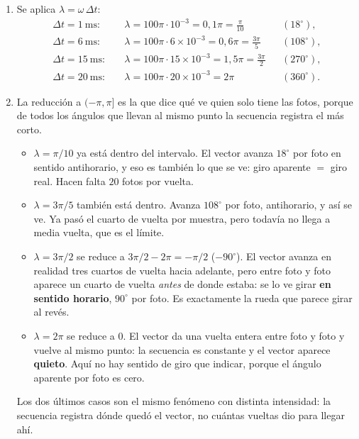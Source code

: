 \documentclass[10pt,a4paper]{article}
\begin{document}
	\begin{enumerate}
		\item Se aplica $\lambda = \omega\,\Delta t$:
		\[
			\begin{aligned}
				\Delta t = 1\ \text{ms}: &\quad \lambda = 100\pi\cdot 10^{-3} = 0{,}1\pi = \tfrac{\pi}{10} && (18^\circ),\\
				\Delta t = 6\ \text{ms}: &\quad \lambda = 100\pi\cdot 6\times10^{-3} = 0{,}6\pi = \tfrac{3\pi}{5} && (108^\circ),\\
				\Delta t = 15\ \text{ms}: &\quad \lambda = 100\pi\cdot 15\times10^{-3} = 1{,}5\pi = \tfrac{3\pi}{2} && (270^\circ),\\
				\Delta t = 20\ \text{ms}: &\quad \lambda = 100\pi\cdot 20\times10^{-3} = 2\pi && (360^\circ).
			\end{aligned}
		\]

		\item La reducción a $(-\pi,\pi]$ es la que dice qué ve quien
		solo tiene las fotos, porque de todos los ángulos que llevan al mismo punto la
		secuencia registra el más corto.
		\begin{itemize}[nosep]
			\item $\lambda = \pi/10$ ya está dentro del intervalo. El vector avanza
			      $18^\circ$ por foto en sentido antihorario, y eso es también lo que se ve:
			      giro aparente $=$ giro real. Hacen falta $20$ fotos por vuelta.
			\item $\lambda = 3\pi/5$ también está dentro. Avanza $108^\circ$ por foto,
			      antihorario, y así se ve. Ya pasó el cuarto de vuelta por muestra, pero
			      todavía no llega a media vuelta, que es el límite.
			\item $\lambda = 3\pi/2$ se reduce a $3\pi/2 - 2\pi = -\pi/2$ ($-90^\circ$). El
			      vector avanza en realidad tres cuartos de vuelta hacia adelante, pero entre
			      foto y foto aparece un cuarto de vuelta \emph{antes} de donde estaba: se lo
			      ve girar \textbf{en sentido horario}, $90^\circ$ por foto. Es exactamente la
			      rueda que parece girar al revés.
			\item $\lambda = 2\pi$ se reduce a $0$. El vector da una vuelta entera entre foto y
			      foto y vuelve al mismo punto: la secuencia es constante y el vector aparece
			      \textbf{quieto}. Aquí no hay sentido de giro que indicar, porque el ángulo
			      aparente por foto es cero.
		\end{itemize}
		Los dos últimos casos son el mismo fenómeno con distinta intensidad: la secuencia
		registra dónde quedó el vector, no cuántas vueltas dio para llegar ahí.


\end{enumerate}
\end{document}
